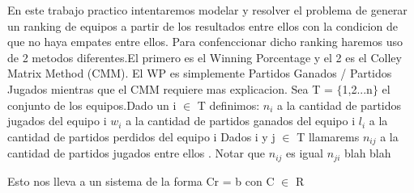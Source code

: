 En este trabajo practico intentaremos modelar y resolver el problema de generar un ranking de equipos a partir de los resultados entre ellos con la condicion de que no haya empates entre ellos. 
Para confenccionar dicho ranking haremos uso de 2 metodos diferentes.El primero
es el Winning Porcentage y el 2 es el Colley Matrix Method (CMM).
El WP es simplemente Partidos Ganados / Partidos Jugados mientras que el CMM
requiere mas explicacion.\newline
Sea T = $\{$1,2...n$\}$ el conjunto de los equipos.Dado un i $\in$ T definimos:\newline
$n_i$ a la cantidad de partidos jugados del equipo i
$w_i$ a la cantidad de partidos ganados del equipo i
$l_i$ a la cantidad de partidos perdidos del equipo i
Dados i y j $\in$ T llamarems $n_{ij}$ a la cantidad de partidos jugados entre ellos . Notar
que $n_{ij}$ es igual $n_{ji}$
blah blah 

Esto nos lleva a un sistema de la forma Cr = b con C $\in$ R

